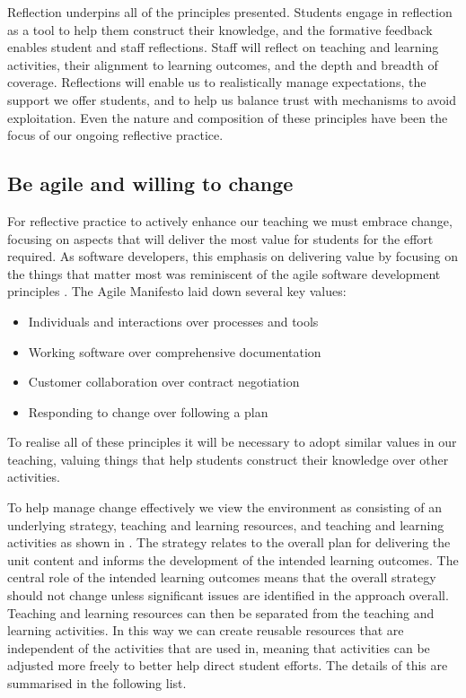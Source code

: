 Reflection underpins all of the principles presented. Students engage in reflection as a tool to help them construct their knowledge, and the formative feedback enables student and staff reflections. Staff will reflect on teaching and learning activities, their alignment to learning outcomes, and the depth and breadth of coverage. Reflections will enable us to realistically manage expectations, the support we offer students, and to help us balance trust with mechanisms to avoid exploitation. Even the nature and composition of these principles have been the focus of our ongoing reflective practice.



\subsection{Be agile and willing to change} %
\label{ssub:be_agile_and_willing_to_change}

For reflective practice to actively enhance our teaching we must embrace change, focusing on aspects that will deliver the most value for students for the effort required. As software developers, this emphasis on delivering value by focusing on the things that matter most was reminiscent of the agile software development principles \cite{Martin:2003}. The Agile Manifesto \cite{Beck:2001} laid down several key values: 

\begin{itemize}
	\item Individuals and interactions over processes and tools
	\item Working software over comprehensive documentation
	\item Customer collaboration over contract negotiation
	\item Responding to change over following a plan
\end{itemize}

\noindent To realise all of these principles it will be necessary to adopt similar values in our teaching, valuing things that help students construct their knowledge over other activities.

To help manage change effectively we view the environment as consisting of an underlying strategy, teaching and learning resources, and teaching and learning activities as shown in . The strategy relates to the overall plan for delivering the unit content and informs the development of the intended learning outcomes. The central role of the intended learning outcomes means that the overall strategy should not change unless significant issues are identified in the approach overall. Teaching and learning resources can then be separated from the teaching and learning activities. In this way we can create reusable resources that are independent of the activities that are used in, meaning that activities can be adjusted more freely to better help direct student efforts. The details of this are summarised in the following list.

